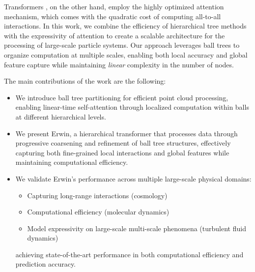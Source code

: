 Transformers \cite{Vaswani2017AttentionIA}, on the other hand, employ the highly optimized attention mechanism, which comes with the quadratic cost of computing all-to-all interactions. In this work, we combine the efficiency of hierarchical tree methods with the expressivity of attention to create a scalable architecture for the processing of large-scale particle systems. Our approach leverages ball trees to organize computation at multiple scales, enabling both local accuracy and global feature capture while maintaining \emph{linear} complexity in the number of nodes. 

The main contributions of the work are the following:
\begin{itemize}[leftmargin=20pt, topsep=-1pt, itemsep=-1pt]
    \item We introduce ball tree partitioning for efficient point cloud processing, enabling linear-time self-attention through localized computation within balls at different hierarchical levels.
    \item We present Erwin, a hierarchical transformer that processes data through progressive coarsening and refinement of ball tree structures, effectively capturing both fine-grained local interactions and global features while maintaining computational efficiency.
    \item We validate Erwin's performance across multiple large-scale physical domains:
        \begin{itemize}[leftmargin=20pt, topsep=-1pt, itemsep=-1pt]
            \item Capturing long-range interactions (cosmology)
            \item Computational efficiency (molecular dynamics)
            \item Model expressivity on large-scale multi-scale phenomena (turbulent fluid dynamics)
        \end{itemize}
    achieving state-of-the-art performance in both computational efficiency and prediction accuracy.
\end{itemize}




